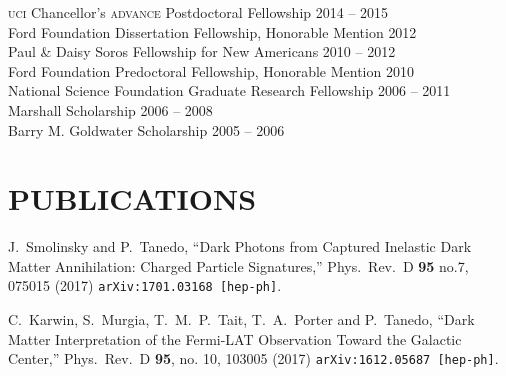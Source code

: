 \documentclass[margin,line]{resume}
\newcommand{\mydate}{}
\newcommand{\scap}[1]{\textsc{\MakeLowercase{#1}}}
\begin{document}
\begin{resume}
\scap{UCI} Chancellor's \scap{ADVANCE} Postdoctoral Fellowship%
\hfill%
	{\mydate 
2014 -- 2015
}\vspace{.7mm}\\
%
Ford Foundation Dissertation Fellowship, Honorable Mention 
\hfill%
{\mydate
2012
}\vspace{.7mm}\\
%
Paul \& Daisy Soros Fellowship for New Americans
\hfill%
{\mydate
2010 -- 2012
}\vspace{.7mm}\\
%
Ford Foundation Predoctoral Fellowship, Honorable Mention 
\hfill%
{\mydate
2010
}\vspace{.7mm}\\
%
National Science Foundation Graduate Research Fellowship
\hfill
{\mydate
2006 -- 2011
}\vspace{.7mm}\\
%
Marshall Scholarship
\hfill
{\mydate
2006 -- 2008
}\vspace{.7mm}\\
%
Barry M. Goldwater Scholarship
\hfill
{\mydate
2005 -- 2006
}\vspace{.7mm}\\    
\vspace{-6mm}


%
\section{\footnotesize \sc
\sffamily 
{}PUBLICATIONS
}


  J.~Smolinsky and P.~Tanedo,
  ``Dark Photons from Captured Inelastic Dark Matter Annihilation: Charged Particle Signatures,''
  Phys.\ Rev.\ D {\bf 95} no.7,  075015 (2017)
  \texttt{arXiv:1701.03168 [hep-ph]}.  %
  \vspace{-2mm}

  C.~Karwin, S.~Murgia, T.~M.~P.~Tait, T.~A.~Porter and P.~Tanedo,
  ``Dark Matter Interpretation of the Fermi-LAT Observation Toward the Galactic Center,''
  Phys.\ Rev.\ D {\bf 95}, no. 10, 103005 (2017)
  \texttt{arXiv:1612.05687 [hep-ph]}.
	\vspace{-2mm}


\end{resume}
\end{document}
